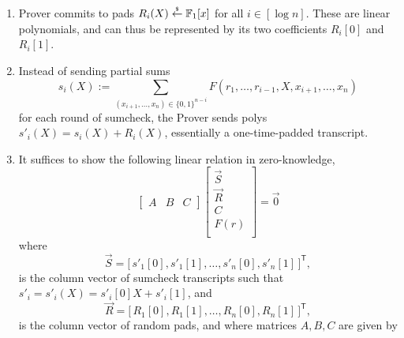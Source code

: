 \begin{mdframed}[style=zkprotocolwithheader, frametitle=Adding ZK to sumcheck]
    \begin{enumerate}
        \item Prover commits to pads $R_i(X) \overset{{\scriptscriptstyle\$}}{\leftarrow} \mathbb{F}_1[x]$ for all $i \in [\log n]$. These are linear polynomials, and can thus be represented by its two coefficients $R_i[0]$ and $R_i[1]$.
        \item Instead of sending partial sums 
        \begin{equation*}
        s_i(X) := \sum_{(x_{i+1}, \dots, x_n) \in \{0,1\}^{n-i}} F(r_1, \dots, r_{i-1}, X, x_{i+1}, \dots, x_n)
        \end{equation*}
        for each round of sumcheck, the Prover sends polys $s'_i(X) = s_i(X) + R_i(X)$, essentially a one-time-padded transcript.
        \item It suffices to show the following linear relation in zero-knowledge, 
        \begin{equation*}
        \left[\begin{array}{c|c|c}
        A & B & C
        \end{array}\right]
        \left[\begin{array}{c}
            \vec{S} \\
            \hline
            \vec{R} \\
            \hline
            C \\
            F(r) \\
        \end{array}\right]
        = 
        \vec{0}
        \end{equation*}
        where
        \[
        \vec{S} = 
        \bigl[\, s'_1[0], s'_1[1], \dots, s'_n[0], s'_n[1] \,\bigr]^{\mathsf T}, 
        \]
        is the column vector of sumcheck transcripts such that $s'_i = s'_i(X) = s'_i[0]X + s'_i[1]$, and
        \[
        \vec{R} = 
        \bigl[\, R_1[0], R_1[1], \dots, R_n[0], R_n[1] \,\bigr]^{\mathsf T},
        \]
        is the column vector of random pads, and where matrices $A,B,C$ are given by


\end{enumerate}
\end{mdframed}
